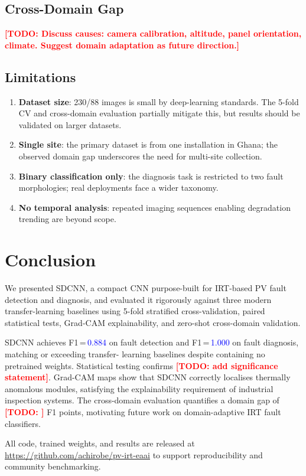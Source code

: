 \documentclass[5p,times,twocolumn]{elsarticle}
\newcommand{\todo}[1]{\textcolor{red}{\textbf{[TODO: #1]}}}
\newcommand{\numres}[1]{\textcolor{blue}{#1}}  %
\begin{document}
\subsection{Cross-Domain Gap}
\todo{Discuss causes: camera calibration, altitude, panel orientation,
climate. Suggest domain adaptation as future direction.}

\subsection{Limitations}
\begin{enumerate}
  \item \textbf{Dataset size}: 230/88 images is small by deep-learning
        standards. The 5-fold CV and cross-domain evaluation partially
        mitigate this, but results should be validated on larger datasets.
  \item \textbf{Single site}: the primary dataset is from one installation
        in Ghana; the observed domain gap underscores the need for
        multi-site collection.
  \item \textbf{Binary classification only}: the diagnosis task is restricted
        to two fault morphologies; real deployments face a wider taxonomy.
  \item \textbf{No temporal analysis}: repeated imaging sequences enabling
        degradation trending are beyond scope.
\end{enumerate}


\section{Conclusion}
\label{sec:conclusion}

We presented SDCNN, a compact CNN purpose-built for IRT-based PV fault
detection and diagnosis, and evaluated it rigorously against three modern
transfer-learning baselines using 5-fold stratified cross-validation,
paired statistical tests, Grad-CAM explainability, and zero-shot
cross-domain validation.

SDCNN achieves F1\,=\,\numres{0.884} on fault detection and
F1\,=\,\numres{1.000} on fault diagnosis, matching or exceeding transfer-
learning baselines despite containing no pretrained weights.
Statistical testing confirms \todo{add significance statement}.
Grad-CAM maps show that SDCNN correctly localises thermally anomalous
modules, satisfying the explainability requirement of industrial inspection
systems.
The cross-domain evaluation quantifies a domain gap of \todo{} F1 points,
motivating future work on domain-adaptive IRT fault classifiers.

All code, trained weights, and results are released at
\url{https://github.com/achirobe/pv-irt-eaai} to support reproducibility
and community benchmarking.




\end{document}
